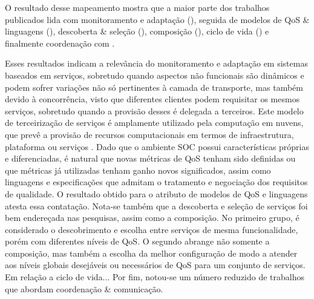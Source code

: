 O resultado desse mapeamento mostra que a maior parte dos trabalhos publicados lida com monitoramento e adapta\c{c}\~{a}o (\MonitoramentoAdaptacao), seguida de modelos de QoS \& linguagens (\ModelosdeQoSeLinguagens), descoberta \& sele\c{c}\~{a}o (\DescobrimentoSelecao),  composi\c{c}\~{a}o (\Composicao), ciclo de vida (\Ciclodevida) e finalmente coordenação com \CoodenacaoComunicacao.

Esses resultados indicam a relevância do monitoramento e adaptação em sistemas baseados em serviços, sobretudo quando aspectos não funcionais  são dinâmicos e podem sofrer variações não só pertinentes à camada de transporte, mas também devido à concorrência, visto que diferentes clientes podem requisitar os mesmos serviços, sobretudo quando a provisão desses é delegada a terceiros. Este modelo de terceirização de serviços é amplamente utilizado pela computação em nuvens, que prevê a provisão de recursos computacionais em termos de infraestrutura, plataforma ou serviços \cite{10.1109/MIC.2010.147}. Dado que o ambiente SOC possui características próprias e diferenciadas, é natural que novas métricas de QoS tenham sido definidas ou que métricas já utilizadas tenham ganho novos significados, assim como linguagens e especificações que admitam o tratamento e negociação dos requisitos de qualidade. O resultado obtido para o atributo de modelos de QoS e linguagens atesta essa contatação. Nota-se também que a descoberta e seleção de serviços foi bem endereçada nas pesquisas, assim como a composição. No primeiro grupo, é considerado o descobrimento e escolha entre serviços de mesma funcionalidade, porém com diferentes níveis de QoS. O segundo abrange não somente a composição, mas também a escolha da melhor configuração de modo a atender aos níveis globais desejáveis ou necessários de QoS para um conjunto de serviços. Em relação a ciclo de vida... Por fim, notou-se um número reduzido de trabalhos que abordam coordenação \& comunicação. 